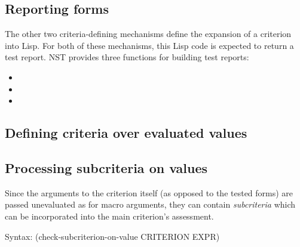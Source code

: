 \subsection{Reporting forms}
\label{sec:criteria-forms-report}
The other two criteria-defining mechanisms define the expansion of a
criterion into Lisp.  For both of these mechanisms, this Lisp code is
expected to return a test report.  NST provides three functions for
building test reports:
\begin{itemize}
\item
  
\item
  
\item
  
\end{itemize}

\subsection{Defining criteria over evaluated values}
\label{sec:def-criterion}
%

\subsection{Processing subcriteria on values}
\label{sec:subcriteria-values}
Since the arguments to the criterion itself (as opposed to the tested
forms) are passed unevaluated as for macro arguments, they can contain
\emph{subcriteria} which can be incorporated into the main criterion's
assessment.%

{\ttfamily\begin{tabbing}
\textrm{Syntax: }(check-subcriterion-on-value CRITERION EXPR)
\end{tabbing}}
% 

